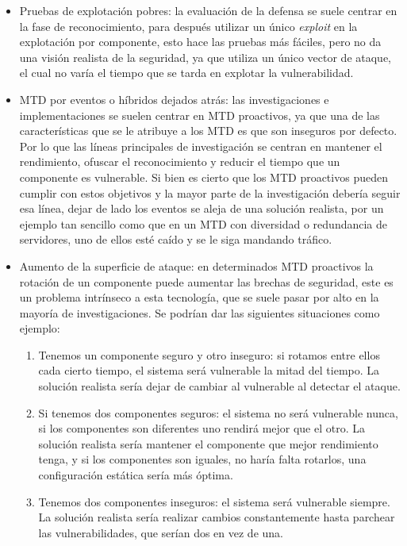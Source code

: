 \begin{itemize}
    \item Pruebas de explotación pobres: la evaluación de la defensa se suele centrar en la fase de reconocimiento, para después utilizar un único \textit{exploit} en la explotación por componente, esto hace las pruebas más fáciles, pero no da una visión realista de la seguridad, ya que utiliza un único vector de ataque, el cual no varía el tiempo que se tarda en explotar la vulnerabilidad.
    \item MTD por eventos o híbridos dejados atrás: las investigaciones e implementaciones se suelen centrar en MTD proactivos, ya que una de las características que se le atribuye a los MTD es que son inseguros por defecto. Por lo que las líneas principales de investigación se centran en mantener el rendimiento, ofuscar el reconocimiento y reducir el tiempo que un componente es vulnerable. Si bien es cierto que los MTD proactivos pueden cumplir con estos objetivos y la mayor parte de la investigación debería seguir esa línea, dejar de lado los eventos se aleja de una solución realista, por un ejemplo tan sencillo como que en un MTD con diversidad o redundancia de servidores, uno de ellos esté caído y se le siga mandando tráfico.
    \item Aumento de la superficie de ataque: en determinados MTD proactivos la rotación de un componente puede aumentar las brechas de seguridad\cite{MTD-critica}, este es un problema intrínseco a esta tecnología, que se suele pasar por alto en la mayoría de investigaciones. Se podrían dar las siguientes situaciones como ejemplo:
    \begin{enumerate}
        \item Tenemos un componente seguro y otro inseguro: si rotamos entre ellos cada cierto tiempo, el sistema será vulnerable la mitad del tiempo. La solución realista sería dejar de cambiar al vulnerable al detectar el ataque.
        \item Si tenemos dos componentes seguros: el sistema no será vulnerable nunca, si los componentes son diferentes uno rendirá mejor que el otro. La solución realista sería mantener el componente que mejor rendimiento tenga, y si los componentes son iguales, no haría falta rotarlos, una configuración estática sería más óptima.
        \item Tenemos dos componentes inseguros: el sistema será vulnerable siempre. La solución realista sería realizar cambios constantemente hasta parchear las vulnerabilidades, que serían dos en vez de una.

\end{enumerate}
\end{itemize}
